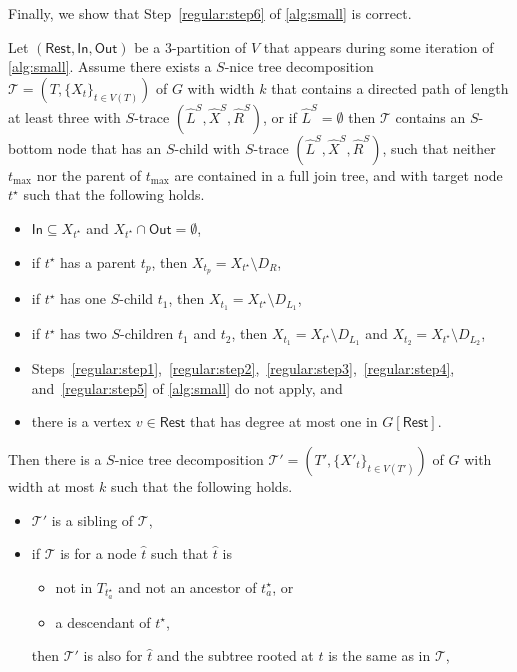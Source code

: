 \documentclass[a4paper,UKenglish,cleveref, autoref, thm-restate, numberwithinsect]{lipics-v2021}
\newcommand{\slim}{\text{slim}\xspace}
\newcommand{\topheavy}{\text{top-heavy}\xspace}
\newcommand{\In}{\mathsf{In}}
\newcommand{\Out}{\mathsf{Out}}
\newcommand{\Rest}{\mathsf{Rest}}
\begin{document}
Finally, we show that Step~\ref{regular:step6} of \cref{alg:small} is correct.

\begin{lemma}\label{lem:regularstep6}
Let $(\Rest,\In,\Out)$ be a 3-partition of $V$ that appears during some iteration of \cref{alg:small}. 
Assume there exists a \slim $S$-nice tree decomposition $\mathcal{T}=(T,\{X_t\}_{t\in V(T)})$ of $G$ with width $k$ that contains a directed path of length at least three with $S$-trace $(\hat{L}^S, \hat{X}^S, \hat{R}^S)$, or if $\hat{L}^S=\emptyset$ then $\mathcal{T}$ contains an $S$-bottom node that has an $S$-child with $S$-trace $(\hat{L}^S, \hat{X}^S, \hat{R}^S)$, such that neither $t_{\max}$ nor the parent of $t_{\max}$ are contained in a full join tree, and with target node ${t^\star}$ such that the following holds.
\begin{itemize}
\item $\In\subseteq X_{t^\star}$ and $X_{t^\star}\cap \Out=\emptyset$, 
                \item if $t^\star$ has a parent $t_p$, then $X_{t_p}=X_{t^\star}\setminus D_R$, 
    \item if $t^\star$ has one $S$-child $t_1$, then $X_{t_1}=X_{t^\star}\setminus D_{L_1}$, 
    \item if $t^\star$ has two $S$-children $t_1$ and $t_2$, then $X_{t_1}=X_{t^\star}\setminus D_{L_1}$ and $X_{t_2}=X_{t^\star}\setminus D_{L_2}$, 
    \item Steps~\ref{regular:step1},~\ref{regular:step2},~\ref{regular:step3},~\ref{regular:step4}, and~\ref{regular:step5} of \cref{alg:small} do not apply, and
    \item there is a vertex $v\in\Rest$ that has degree at most one in $G[\Rest]$.
\end{itemize} 
Then there is a \slim $S$-nice tree decomposition $\mathcal{T}'=(T',\{X'_t\}_{t\in V(T')})$ of $G$ with width at most $k$ 
such that the following holds.
\begin{itemize}
\item $\mathcal{T}'$ is a sibling of $\mathcal{T}$,
\item if $\mathcal{T}$ is \topheavy for a node $\hat{t}$ such that $\hat{t}$ is
\begin{itemize}
    \item not in $T_{t^\star_a}$ and not an ancestor of $t^\star_a$, or
    \item a descendant of $t^\star$,
\end{itemize}
then $\mathcal{T}'$ is also \topheavy for $\hat{t}$ and the subtree rooted at $\hat{t}$ is the same as in $\mathcal{T}$,

\end{itemize}
\end{lemma}
\end{document}
